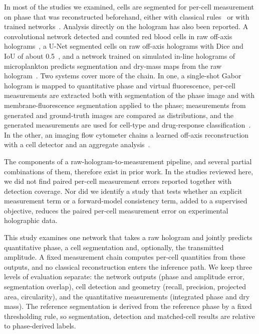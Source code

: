 \documentclass[11pt]{article}
\begin{document}
In most of the studies we examined, cells are segmented for per-cell
measurement on phase that was reconstructed beforehand, either with classical
rules~\cite{shen2022laf,bai2026macrophage,kyeremah2025malaria} or with trained
networks~\cite{li2025dlcspf,park2025holofluonet}. Analysis directly on the
hologram has also been reported. A convolutional network detected and counted
red blood cells in raw off-axis holograms~\cite{trujillo2019automatic}, a U-Net
segmented cells on raw off-axis holograms with Dice and IoU of about
0.5~\cite{wen2026direct}, and a network trained on simulated in-line holograms
of microplankton predicts segmentation and dry-mass maps from the raw
hologram~\cite{bachimanchi2022microplankton}. Two systems cover more of the
chain. In one, a single-shot Gabor hologram is mapped to quantitative phase and
virtual fluorescence, per-cell measurements are extracted both with
segmentation of the phase image and with membrane-fluorescence segmentation
applied to the phase; measurements from generated and ground-truth images are
compared as distributions, and the generated measurements are used for
cell-type and drug-response classification~\cite{park2026ai}.
In the other, an imaging flow cytometer chains a learned off-axis
reconstruction with a cell detector and an aggregate
analysis~\cite{delikoyun2025rthad}.

The components of a raw-hologram-to-measurement pipeline, and several partial
combinations of them, therefore exist in prior work. In the studies reviewed
here, we did not find paired per-cell measurement errors reported together with
detection coverage. Nor did we identify a study that tests whether an explicit
measurement term or a forward-model consistency term, added to a supervised
objective, reduces the paired per-cell measurement error on experimental
holographic data.

This study examines one network that takes a raw hologram and jointly predicts
quantitative phase, a cell segmentation and, optionally, the transmitted
amplitude. A fixed measurement chain computes per-cell quantities from these
outputs, and no classical reconstruction enters the inference path. We keep
three levels of evaluation separate: the network outputs (phase and amplitude
error, segmentation overlap), cell detection and geometry (recall, precision,
projected area, circularity), and the quantitative measurements (integrated
phase and dry mass). The reference segmentation is derived from the reference
phase by a fixed thresholding rule, so segmentation, detection and matched-cell
results are relative to phase-derived labels.
\end{document}
